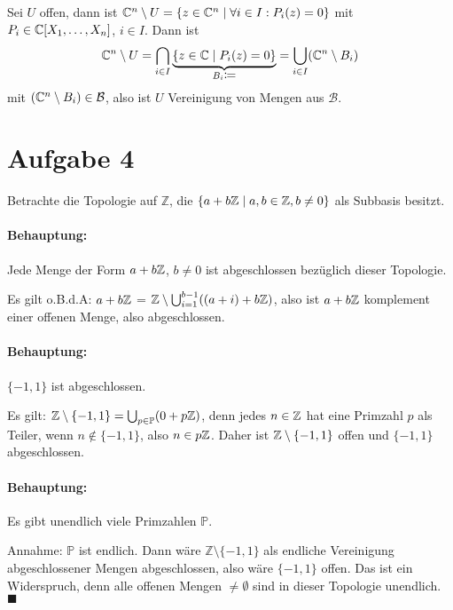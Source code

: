 \documentclass{article}
\begin{document}
Sei $U$ offen, dann ist $\mathbb{C}^n \setminus U = \{ z\in \mathbb{C}^n \mid \forall i\in I: P_i(z) = 0 \}$ mit $P_i\in \mathbb{C}[X_1,\ldots,X_n]$, $i\in I$. Dann ist
\[
\mathbb{C}^n\setminus U = \bigcap_{i\in I} \underbrace{\{z\in \mathbb{C} \mid P_i(z)=0\}}_{B_i\mathrel{\mbox{$\coloneqq$}}} = \bigcup_{i\in I}(\mathbb{C}^n\setminus B_i)
\]
mit $(\mathbb{C}^n\setminus B_i)\in \mathcal B$, also ist $U$ Vereinigung von Mengen aus $\mathcal B$.


\section*{Aufgabe 4}

Betrachte die Topologie auf $\mathbb Z$, die $\{a + b\mathbb Z\mid a, b\in \mathbb{Z}, b\ne 0\}$ als Subbasis besitzt.



\paragraph{Behauptung:} Jede Menge der Form $a+b\mathbb{Z}$, $b\ne 0$ ist abgeschlossen bezüglich dieser Topologie.

Es gilt o.B.d.A: $a + b \mathbb{Z}$ = $\mathbb{Z} \setminus \bigcup_{i=1}^{b-1}((a+i) + b \mathbb{Z})$, also ist $a + b\mathbb{Z}$ komplement einer offenen Menge, also abgeschlossen.

\paragraph{Behauptung:} $\{-1,1\}$ ist abgeschlossen.

Es gilt: $\mathbb{Z} \setminus \{-1,1\} = \bigcup_{p\in \mathbb P} (0 + p\mathbb{Z})$, denn jedes $n\in \mathbb{Z}$ hat eine Primzahl $p$ als Teiler, wenn $n \notin \{-1,1\}$, also $n\in p\mathbb{Z}$. Daher ist $\mathbb{Z}\setminus \{-1,1\}$ offen und $\{-1,1\}$ abgeschlossen.

\paragraph{Behauptung:} Es gibt unendlich viele Primzahlen $\mathbb P$.

Annahme: $\mathbb P$ ist endlich. Dann wäre $\mathbb Z\setminus\{-1,1\}$ als endliche Vereinigung abgeschlossener Mengen abgeschlossen, also wäre $\{-1,1\}$ offen. Das ist ein Widerspruch, denn alle offenen Mengen $\ne \emptyset$ sind in dieser Topologie unendlich.
\phantom{Anfang}\hfill{$\blacksquare$}
\end{document}
